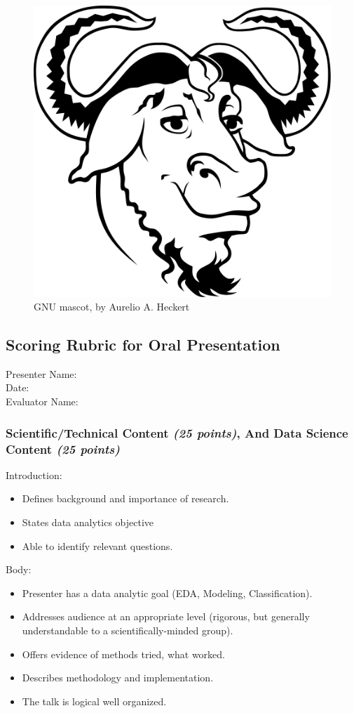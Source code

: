 \documentclass[11pt]{article} %
\begin{document}
      \begin{figure}[h]
        \centering
        \includegraphics[width=0.25\linewidth]{figs/Heckert_GNU_white}
        \caption{GNU mascot, by Aurelio A. Heckert}
        \label{fig:gnu-mascot}
      \end{figure}
    
    
  \pagebreak
    \subsection{Scoring Rubric for Oral Presentation}
    Presenter Name:   \\
    Date: \\
    Evaluator Name: 
    
      \subsubsection{Scientific/Technical Content \emph{(25 points)}, And Data Science Content \emph{(25 points)}}
      
      Introduction: 
        \begin{itemize}   \itemsep0pt
            \item{Defines background and importance of research.}
            \item{States data analytics objective}
            \item{Able to identify relevant questions.}
        \end{itemize}
        
      \noindent Body:
        \begin{itemize}  \itemsep0pt
            \item{Presenter has a data analytic goal (EDA, Modeling, Classification).}
            \item{Addresses audience at an appropriate level (rigorous, but generally understandable to a scientifically-minded group).}
            \item{Offers evidence of methods tried, what worked.}
            \item{Describes methodology and implementation.}
            \item{The talk is logical well organized.}
        \end{itemize}
      
\end{document}
